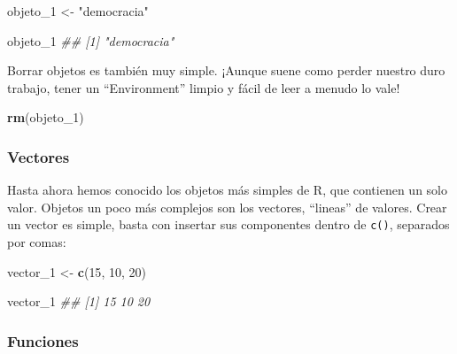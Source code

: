 \documentclass[]{book}
\newenvironment{Shaded}{\begin{snugshade}}{\end{snugshade}}
\newcommand{\CommentTok}[1]{\textcolor[rgb]{0.56,0.35,0.01}{\textit{#1}}}
\newcommand{\DecValTok}[1]{\textcolor[rgb]{0.00,0.00,0.81}{#1}}
\newcommand{\KeywordTok}[1]{\textcolor[rgb]{0.13,0.29,0.53}{\textbf{#1}}}
\newcommand{\NormalTok}[1]{#1}
\newcommand{\StringTok}[1]{\textcolor[rgb]{0.31,0.60,0.02}{#1}}
\begin{document}
\begin{Shaded}
\begin{Highlighting}[]
\NormalTok{objeto_}\DecValTok{1}\NormalTok{ <-}\StringTok{ "democracia"}
\end{Highlighting}
\end{Shaded}

\begin{Shaded}
\begin{Highlighting}[]
\NormalTok{objeto_}\DecValTok{1} 
\CommentTok{## [1] "democracia"}
\end{Highlighting}
\end{Shaded}

Borrar objetos es también muy simple. ¡Aunque suene como perder nuestro
duro trabajo, tener un ``Environment'' limpio y fácil de leer a menudo
lo vale!

\begin{Shaded}
\begin{Highlighting}[]
\KeywordTok{rm}\NormalTok{(objeto_}\DecValTok{1}\NormalTok{)}
\end{Highlighting}
\end{Shaded}

\hypertarget{vectores}{%
\subsubsection{Vectores}\label{vectores}}

Hasta ahora hemos conocido los objetos más simples de R, que contienen
un solo valor. Objetos un poco más complejos son los vectores,
``lineas'' de valores. Crear un vector es simple, basta con insertar sus
componentes dentro de \texttt{c()}, separados por comas:

\begin{Shaded}
\begin{Highlighting}[]
\NormalTok{vector_}\DecValTok{1}\NormalTok{ <-}\StringTok{ }\KeywordTok{c}\NormalTok{(}\DecValTok{15}\NormalTok{, }\DecValTok{10}\NormalTok{, }\DecValTok{20}\NormalTok{)}
\end{Highlighting}
\end{Shaded}

\begin{Shaded}
\begin{Highlighting}[]
\NormalTok{vector_}\DecValTok{1}
\CommentTok{## [1] 15 10 20}
\end{Highlighting}
\end{Shaded}

\hypertarget{funciones}{%
\subsubsection{Funciones}\label{funciones}}
\end{document}
